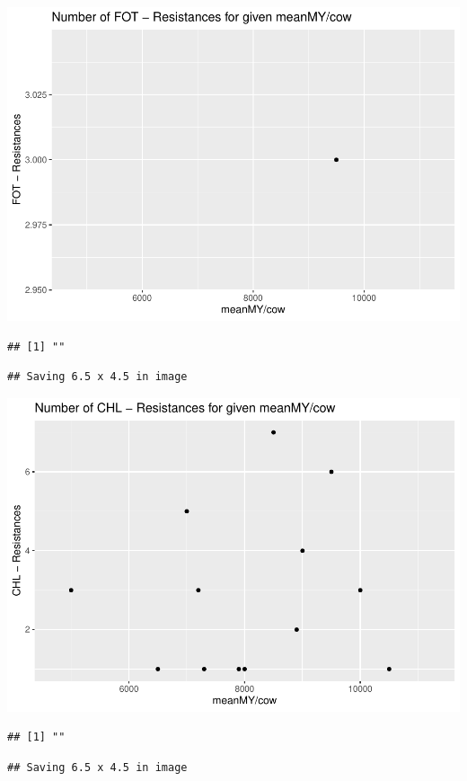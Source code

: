 \documentclass[
]{article}
\begin{document}
\includegraphics{NResistenzen_files/figure-latex/numerical_variables-5.pdf}

\begin{verbatim}
## [1] ""
\end{verbatim}

\begin{verbatim}
## Saving 6.5 x 4.5 in image
\end{verbatim}

\includegraphics{NResistenzen_files/figure-latex/numerical_variables-6.pdf}

\begin{verbatim}
## [1] ""
\end{verbatim}

\begin{verbatim}
## Saving 6.5 x 4.5 in image
\end{verbatim}
\end{document}

